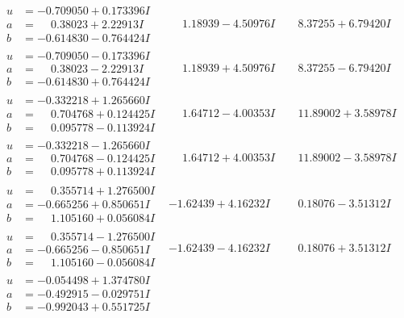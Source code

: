 \documentclass[1p]{elsarticle_modified}
\theoremstyle{definition}
\begin{document}
$$\begin{array}{c|c|c}
\begin{aligned}
u &= -0.709050 + 0.173396 I \\
a &= \phantom{-}0.38023 + 2.22913 I \\
b &= -0.614830 - 0.764424 I\end{aligned}
 & \phantom{-}1.18939 - 4.50976 I & \phantom{-}8.37255 + 6.79420 I \\ \hline\begin{aligned}
u &= -0.709050 - 0.173396 I \\
a &= \phantom{-}0.38023 - 2.22913 I \\
b &= -0.614830 + 0.764424 I\end{aligned}
 & \phantom{-}1.18939 + 4.50976 I & \phantom{-}8.37255 - 6.79420 I \\ \hline\begin{aligned}
u &= -0.332218 + 1.265660 I \\
a &= \phantom{-}0.704768 + 0.124425 I \\
b &= \phantom{-}0.095778 - 0.113924 I\end{aligned}
 & \phantom{-}1.64712 - 4.00353 I & \phantom{-}11.89002 + 3.58978 I \\ \hline\begin{aligned}
u &= -0.332218 - 1.265660 I \\
a &= \phantom{-}0.704768 - 0.124425 I \\
b &= \phantom{-}0.095778 + 0.113924 I\end{aligned}
 & \phantom{-}1.64712 + 4.00353 I & \phantom{-}11.89002 - 3.58978 I \\ \hline\begin{aligned}
u &= \phantom{-}0.355714 + 1.276500 I \\
a &= -0.665256 + 0.850651 I \\
b &= \phantom{-}1.105160 + 0.056084 I\end{aligned}
 & -1.62439 + 4.16232 I & \phantom{-}0.18076 - 3.51312 I \\ \hline\begin{aligned}
u &= \phantom{-}0.355714 - 1.276500 I \\
a &= -0.665256 - 0.850651 I \\
b &= \phantom{-}1.105160 - 0.056084 I\end{aligned}
 & -1.62439 - 4.16232 I & \phantom{-}0.18076 + 3.51312 I \\ \hline\begin{aligned}
u &= -0.054498 + 1.374780 I \\
a &= -0.492915 - 0.029751 I \\
b &= -0.992043 + 0.551725 I\end{aligned}

\end{array}$$
\end{document}

